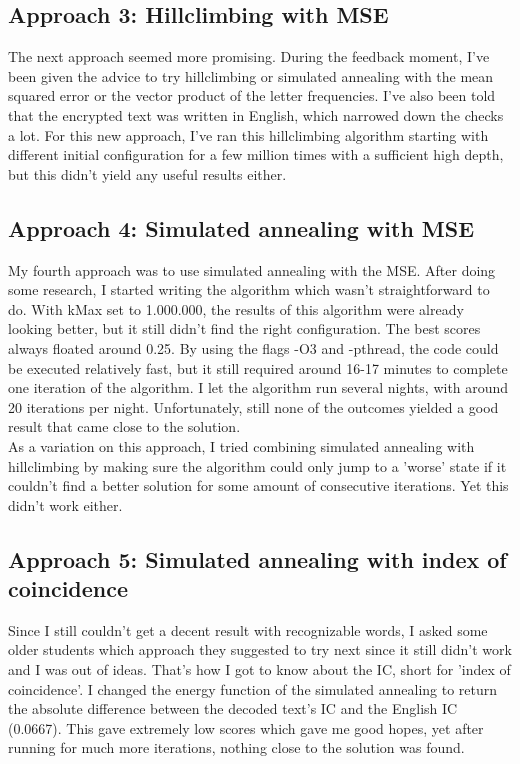 \documentclass{article}
\begin{document}
\subsection{Approach 3: Hillclimbing with MSE}
The next approach seemed more promising. During the feedback moment, I've been given the advice to try hillclimbing or simulated annealing with the mean squared error or the vector product of the letter frequencies. I've also been told that the encrypted text was written in English, which narrowed down the checks a lot. For this new approach, I've ran this hillclimbing algorithm starting with different initial configuration for a few million times with a sufficient high depth, but this didn't yield any useful results either.

\subsection{Approach 4: Simulated annealing with MSE}
My fourth approach was to use simulated annealing with the MSE. After doing some research, I started writing the algorithm which wasn't straightforward to do. With kMax set to 1.000.000, the results of this algorithm were already looking better, but it still didn't find the right configuration. The best scores always floated around 0.25. By using the flags -O3 and -pthread, the code could be executed relatively fast, but it still required around 16-17 minutes to complete one iteration of the algorithm. I let the algorithm run several nights, with around 20 iterations per night. Unfortunately, still none of the outcomes yielded a good result that came close to the solution.\\

\noindent As a variation on this approach, I tried combining simulated annealing with hillclimbing by making sure the algorithm could only jump to a 'worse' state if it couldn't find a better solution for some amount of consecutive iterations. Yet this didn't work either.

\subsection{Approach 5: Simulated annealing with index of coincidence}
Since I still couldn't get a decent result with recognizable words, I asked some older students which approach they suggested to try next since it still didn't work and I was out of ideas. That's how I got to know about the IC, short for 'index of coincidence'. I changed the energy function of the simulated annealing to return the absolute difference between the decoded text's IC and the English IC (0.0667). This gave extremely low scores which gave me good hopes, yet after running for much more iterations, nothing close to the solution was found.
\end{document}
